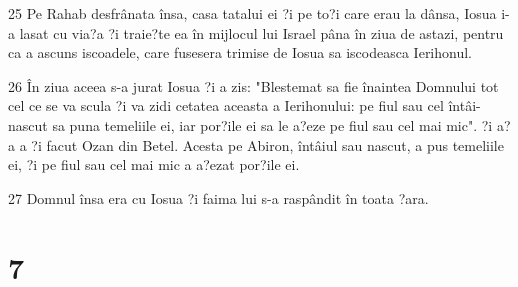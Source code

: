 \par 25 Pe Rahab desfrânata însa, casa tatalui ei ?i pe to?i care erau la dânsa, Iosua i-a lasat cu via?a ?i traie?te ea în mijlocul lui Israel pâna în ziua de astazi, pentru ca a ascuns iscoadele, care fusesera trimise de Iosua sa iscodeasca Ierihonul.
\par 26 În ziua aceea s-a jurat Iosua ?i a zis: "Blestemat sa fie înaintea Domnului tot cel ce se va scula ?i va zidi cetatea aceasta a Ierihonului: pe fiul sau cel întâi-nascut sa puna temeliile ei, iar por?ile ei sa le a?eze pe fiul sau cel mai mic". ?i a?a a ?i facut Ozan din Betel. Acesta pe Abiron, întâiul sau nascut, a pus temeliile ei, ?i pe fiul sau cel mai mic a a?ezat por?ile ei.
\par 27 Domnul însa era cu Iosua ?i faima lui s-a raspândit în toata ?ara.

\chapter{7}

